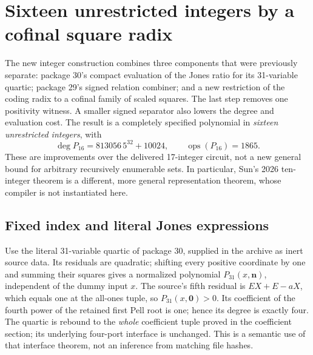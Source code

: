 \section{Sixteen unrestricted integers by a cofinal square radix}
\label{sec:signed16}

The new integer construction combines three components that were previously
separate: package 30's compact evaluation of the Jones ratio for its
31-variable quartic; package 29's signed relation combiner; and a new
restriction of the coding radix to a cofinal family of scaled squares.
The last step removes one positivity witness.  A smaller signed separator
also lowers the degree and evaluation cost.  The result is a completely
specified polynomial in \emph{sixteen unrestricted integers}, with
\[
 \deg P_{16}=813056\,5^{32}+10024,
 \qquad \operatorname{ops}(P_{16})=1865.
\]
These are improvements over the delivered 17-integer circuit, not a new
general bound for arbitrary recursively enumerable sets.  In particular,
Sun's 2026 ten-integer theorem is a different, more general representation
theorem, whose compiler is not instantiated here.

\subsection{Fixed index and literal Jones expressions}

Use the literal 31-variable quartic of package 30, supplied in the archive
as inert source data.  Its residuals are quadratic; shifting every positive
coordinate by one and summing their squares gives a normalized polynomial
\(P_{31}(x,\mathbf n)\), independent of the dummy input \(x\).
The source's fifth residual is \(EX+E-aX\), which equals one at the
all-ones tuple, so \(P_{31}(x,\mathbf0)>0\).  Its coefficient of the
fourth power of the retained first Pell root is one; hence its degree is
exactly four.  The quartic is rebound to the \emph{whole} coefficient tuple
proved in the coefficient section; its underlying four-port interface is
unchanged.  This is a semantic use of that interface theorem, not an
inference from matching file hashes.


